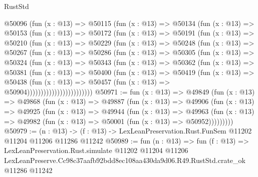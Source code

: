 \begin{lexlean}{RustStd}
\begin{coremodule}
          @50096
            (fun (x : @13) =>
            @50115
              (fun (x : @13) =>
              @50134
                (fun (x : @13) =>
                @50153
                  (fun (x : @13) =>
                  @50172
                    (fun (x : @13) =>
                    @50191
                      (fun (x : @13) =>
                      @50210
                        (fun (x : @13) =>
                        @50229
                          (fun (x : @13) =>
                          @50248
                            (fun (x : @13) =>
                            @50267
                              (fun (x : @13) =>
                              @50286
                                (fun (x : @13) =>
                                @50305
                                  (fun (x : @13) =>
                                  @50324
                                    (fun (x : @13) =>
                                    @50343
                                      (fun (x : @13) =>
                                      @50362
                                        (fun (x : @13) =>
                                        @50381
                                          (fun (x : @13) =>
                                          @50400
                                            (fun (x : @13) =>
                                            @50419
                                              (fun (x : @13) =>
                                              @50438
                                                (fun (x : @13) =>
                                                @50457
                                                  (fun (x : @13) => @50904))))))))))))))))))))))))
@50971 := fun (x : @13) =>
  @49849
    (fun (x : @13) =>
    @49868
      (fun (x : @13) =>
      @49887
        (fun (x : @13) =>
        @49906
          (fun (x : @13) =>
          @49925
            (fun (x : @13) =>
            @49944
              (fun (x : @13) =>
              @49963
                (fun (x : @13) => @49982 (fun (x : @13) => @50001 (fun (x : @13) => @50952)))))))))
@50979 := (n : @13) ->
  (f : @13) -> LexLeanPreservation.Rust.FunSem @11202 @11204 @11206 @11286 @11242
@50989 := fun (n : @13) =>
  fun (f : @13) =>
  LexLeanPreservation.Rust.simulate
    @11202
    @11204
    @11206
    LexLeanPreserve.Cc98c37aafb92bdd8ec108aa430da9d06.R49.RustStd.crate_ok
    @11286
    @11242
\end{coremodule}
\end{lexlean}
